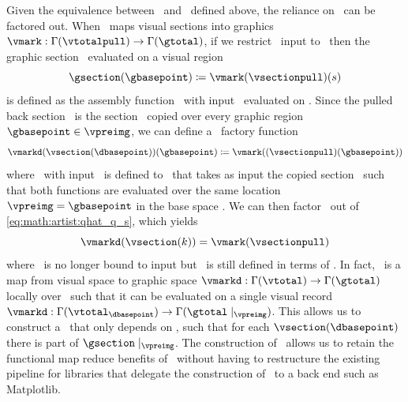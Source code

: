 \documentclass[../main.tex]{subfiles}
\begin{document}
Given the equivalence between \vsection\ and \vsectionpull\ defined above, the reliance on \gbase\ can be factored out. When \vmark\ maps visual sections into graphics $\vmark: \Gamma(\vtotalpull) \rightarrow \Gamma(\gtotal)$, if we restrict \vmark\ input to \vsectionpull\ then the graphic section \gsection\ evaluated on a visual region \gbasepoint\
\begin{equation}
    \gsection(\gbasepoint) \coloneqq \vmark(\vsectionpull)(s)
    \label{eq:math:artist:qhat_factor}
\end{equation}
 is defined as the assembly function \vmark\ with input \vsectionpull\ evaluated on \gbasepoint. Since the pulled back section \vsectionpull\ is the section \vsection\ copied over every graphic region $\gbasepoint \in \vpreimg$, we can define a \vmark\ factory function 
\begin{equation}
\label{eq:math:artist:qhat_q_s}
\vmarkd(\vsection(\dbasepoint))(\gbasepoint) \coloneqq \vmark((\vsectionpull)(\gbasepoint))
\end{equation} 
where \vmarkd\ with input \vsection\ is defined to \vmark\ that takes as input the copied section \vsectionpull\ such that both functions are evaluated over the same location $\vpreimg = \gbasepoint$ in the base space \gbase. We can then factor \gbasepoint\ out of \autoref{eq:math:artist:qhat_q_s}, which yields
\begin{equation}
\vmarkd(\vsection(k)) = \vmark(\vsectionpull)
\label{eq:math:artist:qhat_k}
\end{equation}
where \vmark\ is no longer bound to input but \vmarkd\ is still defined in terms of \dbase. In fact, \vmarkd\ is a map from visual space to graphic space $\vmarkd:\Gamma(\vtotal) \rightarrow \Gamma(\gtotal)$ locally over \dbasepoint\ such that it can be evaluated on a single visual record  $\vmarkd:\Gamma(\vtotal_{\dbasepoint}) \rightarrow \Gamma(\gtotal\mid_{\vpreimg})$. This allows us to construct a \vmarkd\ that only depends on \dbase, such that for each $\vsection(\dbasepoint)$ there is part of $\gsection\mid_{\vpreimg}$. The construction of \vmarkd\ allows us to retain the functional map reduce benefits of \vmark\ without having to restructure the existing pipeline for libraries that delegate the construction of \gsection\ to a back end such as Matplotlib.
\end{document}
